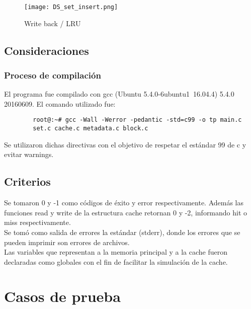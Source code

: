 \documentclass[a4paper,10pt]{article}
\begin{document}
    \begin{figure}[H]
        \centering
        \texttt{[image: DS\_set\_insert.png]}
        \caption{Write back / LRU}
        \label{fig:my_label}
    \end{figure}
    
    \subsection{Consideraciones}
    
    \subsubsection{Proceso de compilación}
        El programa fue compilado con gcc (Ubuntu 5.4.0-6ubuntu1~16.04.4) 5.4.0 20160609. El comando utilizado fue:
    \begin{verbatim}
        root@:~# gcc -Wall -Werror -pedantic -std=c99 -o tp main.c
        set.c cache.c metadata.c block.c
    \end{verbatim}
    
    Se utilizaron dichas directivas con el objetivo de respetar el estándar 99 de c y evitar warnings.
    
    \subsection{Criterios}
        Se tomaron 0 y -1 como códigos de éxito y error respectivamente. Además las funciones read y write de la estructura cache retornan 0 y -2, informando hit o miss respectivamente.\\
        Se tomó como salida de errores la estándar (stderr), donde los errores que se pueden imprimir son errores de archivos.\\
        Las variables que representan a la memoria principal y a la cache fueron declaradas como globales con el fin de facilitar la simulación de la cache.

\section{Casos de prueba}
\end{document}
